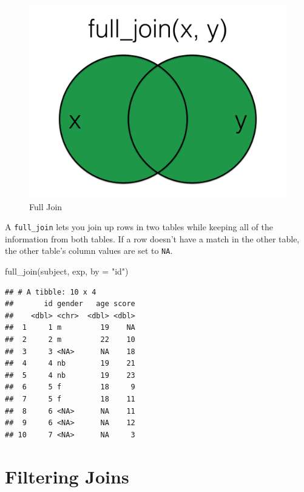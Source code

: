 \documentclass[
  oneside]{book}
\newenvironment{Shaded}{\begin{snugshade}}{\end{snugshade}}
\newcommand{\AttributeTok}[1]{\textcolor[rgb]{0.77,0.63,0.00}{#1}}
\newcommand{\FunctionTok}[1]{\textcolor[rgb]{0.00,0.00,0.00}{#1}}
\newcommand{\NormalTok}[1]{#1}
\newcommand{\StringTok}[1]{\textcolor[rgb]{0.31,0.60,0.02}{#1}}
\begin{document}
\begin{figure}

{\centering \includegraphics[width=1\linewidth]{images/joins/full_join} 

}

\caption{Full Join}\label{fig:img-full-join}
\end{figure}

A \texttt{full\_join} lets you join up rows in two tables while keeping all of the information from both tables. If a row doesn't have a match in the other table, the other table's column values are set to \texttt{NA}.

\begin{Shaded}
\begin{Highlighting}[]
\FunctionTok{full\_join}\NormalTok{(subject, exp, }\AttributeTok{by =} \StringTok{"id"}\NormalTok{)}
\end{Highlighting}
\end{Shaded}

\begin{verbatim}
## # A tibble: 10 x 4
##       id gender   age score
##    <dbl> <chr>  <dbl> <dbl>
##  1     1 m         19    NA
##  2     2 m         22    10
##  3     3 <NA>      NA    18
##  4     4 nb        19    21
##  5     4 nb        19    23
##  6     5 f         18     9
##  7     5 f         18    11
##  8     6 <NA>      NA    11
##  9     6 <NA>      NA    12
## 10     7 <NA>      NA     3
\end{verbatim}

\hypertarget{filtering-joins}{%
\section{Filtering Joins}\label{filtering-joins}}
\end{document}
